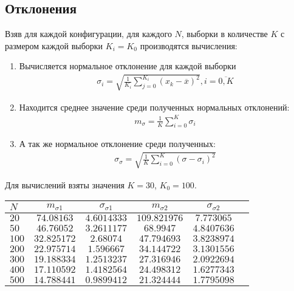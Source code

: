 \subsection{Отклонения}
Взяв для каждой конфигурации, для каждого \(N\), выборки в количестве \(K\) с размером каждой выборки \(K_i = K_0\) производятся вычисления:
\begin{enumerate}
	\item Вычисляется нормальное отклонение для каждой выборки
	      \begin{align}
		      \sigma_i = \sqrt{\frac{1}{K_i}\sum_{j=0}^{K_i} (x_k - \overline{x})^2}, i=\overline{0,K}
	      \end{align}
	\item Находится среднее значение среди полученных нормальных отклонений:
	      \begin{align}
		      m_\sigma = \frac{1}{K}\sum_{i=0}^K \sigma_i
	      \end{align}
	\item А так же нормальное отклонение среди полученных:
	      \begin{align}
		      \sigma_\sigma = \sqrt{\frac{1}{K}\sum_{i=0}^K(\sigma - \sigma_i)^2}
	      \end{align}
\end{enumerate}
Для вычислений взяты значения \(K=30\), \(K_0=100\).
\begin{table}[h!]
	\centering
	\begin{tabular}{|l|c|c|c|c|c|}
		\hline
		$N$     & $m_{\sigma1}$ & $\sigma_{\sigma1}$ & $m_{\sigma2}$  & $\sigma_{\sigma2}$ \\
		\hline
		$  20 $ & $  74.08163 $ & $ 4.6014333 $      & $ 109.821976 $ & $  7.773065 $      \\
		$  50 $ & $  46.76052 $ & $ 3.2611177 $      & $    68.9947 $ & $ 4.8407636 $      \\
		$ 100 $ & $ 32.825172 $ & $   2.68074 $      & $  47.794693 $ & $ 3.8238974 $      \\
		$ 200 $ & $ 22.975714 $ & $  1.596667 $      & $  34.144722 $ & $ 3.1301556 $      \\
		$ 300 $ & $ 19.188334 $ & $ 1.2513237 $      & $  27.316946 $ & $ 2.0922694 $      \\
		$ 400 $ & $ 17.110592 $ & $ 1.4182564 $      & $  24.498312 $ & $ 1.6277343 $      \\
		$ 500 $ & $ 14.788441 $ & $ 0.9899412 $      & $  21.324444 $ & $ 1.7795098 $      \\
		\hline
	\end{tabular}
\end{table}
